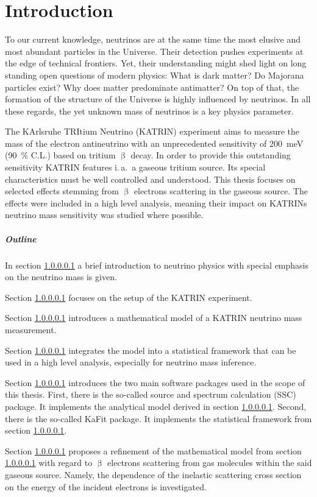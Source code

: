 \chapter{Introduction}
To our current knowledge, neutrinos are at the same time the most elusive and most abundant particles in the Universe. Their detection pushes experiments at the edge of technical frontiers. Yet, their understanding might shed light on long standing open questions of modern physics: What is dark matter? Do Majorana particles exist? Why does matter predominate antimatter? On top of that, the formation of the structure of the Universe is highly influenced by neutrinos. In all these regards, the yet unknown mass of neutrinos is a key physics parameter.

The KArlsruhe TRItium Neutrino (KATRIN) experiment aims to measure the mass of the electron antineutrino with an unprecedented sensitivity of \SI{200}{meV} (\SI{90}{\percent} C.L.) based on tritium $\upbeta$ decay. In order to provide this outstanding sensitivity KATRIN features i.\,a.~a gaseous tritium source. Its special characteristics must be well controlled and understood. This thesis focuses on selected effects stemming from $\upbeta$ electrons scattering in the gaseous source. The effects were included in a high level analysis, meaning their impact on KATRINs neutrino mass sensitivity was studied where possible.

\paragraph{Outline}
In section \ref{} a brief introduction to neutrino physics with special emphasis on the neutrino mass is given.

Section \ref{} focuses on the setup of the KATRIN experiment.

Section \ref{} introduces a mathematical model of a KATRIN neutrino mass measurement.

Section \ref{} integrates the model into a statistical framework that can be used in a high level analysis, especially for neutrino mass inference.

Section \ref{} introduces the two main software packages used in the scope of this thesis. First, there is the so-called source and spectrum calculation (SSC) package. It implements the analytical model derived in section \ref{}. Second, there is the so-called KaFit package. It implements the statistical framework from section \ref{}.

Section \ref{} proposes a refinement of the mathematical model from section \ref{} with regard to $\upbeta$ electrons scattering from gas molecules within the said gaseous source. Namely, the dependence of the inelastic scattering cross section on the energy of the incident electrons is investigated.

